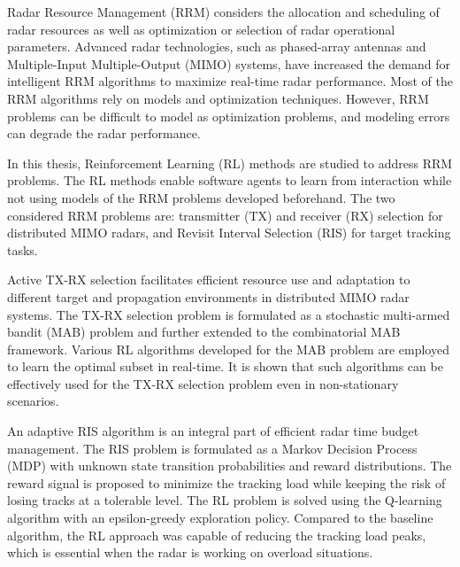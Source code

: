\documentclass[english, 12pt, a4paper, elec, utf8, a-1b, online]{aaltothesis}
\date{31.7.2020}
\numberwithin{equation}{section}
\begin{document}
\makecoverpage

\makecopyrightpage


\begin{abstractpage}[english]
Radar Resource Management (RRM) considers the allocation and scheduling of radar resources as well as optimization or selection of radar operational parameters.
Advanced radar technologies, such as phased-array antennas and Multiple-Input Multiple-Output (MIMO) systems, have increased the demand for intelligent RRM algorithms to maximize real-time radar performance. 
Most of the RRM algorithms rely on models and optimization techniques. 
However, RRM problems can be difficult to model as optimization problems, and modeling errors can degrade the radar performance.

In this thesis, Reinforcement Learning (RL) methods are studied to address RRM problems. 
The RL methods enable software agents to learn from interaction while not using models of the RRM problems developed beforehand. 
The two considered RRM problems are: transmitter (TX) and receiver (RX) selection for distributed MIMO radars, and Revisit Interval Selection (RIS) for target tracking tasks. 

Active TX-RX selection facilitates efficient resource use and adaptation to different target and propagation environments in distributed MIMO radar systems. 
The TX-RX selection problem is formulated as a stochastic multi-armed bandit (MAB) problem and further extended to the combinatorial MAB framework.
Various RL algorithms developed for the MAB problem are employed to learn the optimal subset in real-time. 
It is shown that such algorithms can be effectively used for the TX-RX selection problem even in non-stationary scenarios.

An adaptive RIS algorithm is an integral part of efficient radar time budget management.
The RIS problem is formulated as a Markov Decision Process (MDP) with unknown state transition probabilities and reward distributions. 
The reward signal is proposed to minimize the tracking load while keeping the risk of losing tracks at a tolerable level. 
The RL problem is solved using the Q-learning algorithm with an epsilon-greedy exploration policy.
Compared to the baseline algorithm, the RL approach was capable of reducing the tracking load peaks, which is essential when the radar is working on overload situations.
\end{abstractpage}
\end{document}
